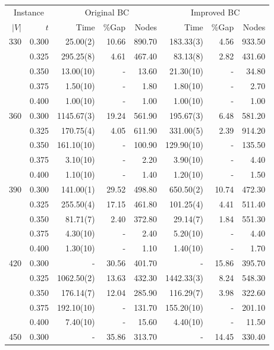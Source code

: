 \begin{table}[Hp]
\scriptsize
\begin{center}
\begin{tabular}{rr|rrr|rrr}
\hline
\multicolumn{2}{c|}{Instance} &
\multicolumn{3}{c|}{Original BC} &
\multicolumn{3}{c}{Improved BC} \\
$|V|$	&	$t$	&		Time	&	\%Gap	&	Nodes	&		Time & \%Gap & Nodes  \\
\hline
330	&	0.300	&		25.00(2)	&	10.66	&	890.70	&		183.33(3)	&	4.56	&	933.50	\\
	&	0.325	&		295.25(8)	&	4.61	&	467.40	&		83.13(8)	&	2.82	&	431.60	\\
	&	0.350	&		13.00(10)	&	-	&	13.60	&		21.30(10)	&	-	&	34.80	\\
	&	0.375	&		1.50(10)	&	-	&	1.80	&		1.80(10)	&	-	&	2.70	\\
	&	0.400	&		1.00(10)	&	-	&	1.00	&		1.00(10)	&	-	&	1.00	\\
\hline
360	&	0.300	&		1145.67(3)	&	19.24	&	561.90	&		195.67(3)	&	6.48	&	581.20	\\
	&	0.325	&		170.75(4)	&	4.05	&	611.90	&		331.00(5)	&	2.39	&	914.20	\\
	&	0.350	&		161.10(10)	&	-	&	100.90	&		129.90(10)	&	-	&	135.50	\\
	&	0.375	&		3.10(10)	&	-	&	2.20	&		3.90(10)	&	-	&	4.40	\\
	&	0.400	&		1.10(10)	&	-	&	1.40	&		1.20(10)	&	-	&	1.50	\\
\hline
390	&	0.300	&		141.00(1)	&	29.52	&	498.80	&		650.50(2)	&	10.74	&	472.30	\\
	&	0.325	&		255.50(4)	&	17.15	&	461.80	&		101.25(4)	&	4.41	&	511.40	\\
	&	0.350	&		81.71(7)	&	2.40	&	372.80	&		29.14(7)	&	1.84	&	551.30	\\
	&	0.375	&		4.30(10)	&	-	&	2.40	&		5.20(10)	&	-	&	4.40	\\
	&	0.400	&		1.30(10)	&	-	&	1.10	&		1.40(10)	&	-	&	1.70	\\
\hline
420	&	0.300	&		-	&	30.56	&	401.70	&		-	&	15.86	&	395.70	\\
	&	0.325	&		1062.50(2)	&	13.63	&	432.30	&		1442.33(3)	&	8.24	&	548.30	\\
	&	0.350	&		176.14(7)	&	12.04	&	285.90	&		116.29(7)	&	3.98	&	322.60	\\
	&	0.375	&		192.10(10)	&	-	&	131.70	&		155.20(10)	&	-	&	201.10	\\
	&	0.400	&		7.40(10)	&	-	&	15.60	&		4.40(10)	&	-	&	11.50	\\
\hline
450	&	0.300	&		-	&	35.86	&	313.70	&		-	&	14.45	&	330.40	\\

\end{tabular}
\end{center}
\end{table}
